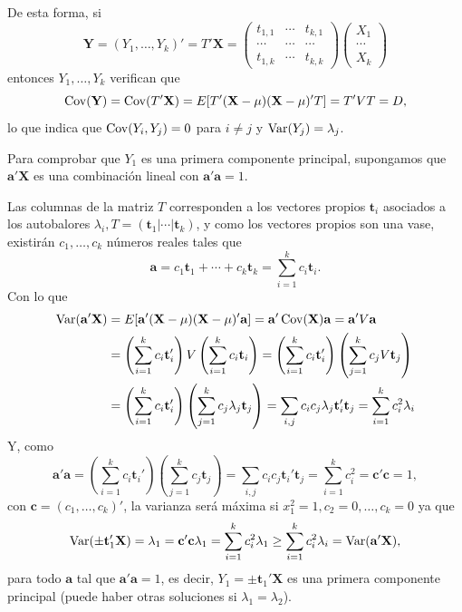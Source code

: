 De esta forma, si \[ \mathbf{Y}=(Y_1,\dots,Y_k)'=T'\mathbf{X}=\begin{pmatrix}
	t_{1,1} & \cdots & t_{k,1} \\
	\cdots & \cdots & \cdots \\
	t_{1,k} & \cdots & t_{k,k}
\end{pmatrix}\begin{pmatrix}
	X_1\\
	\cdots\\
	X_k
\end{pmatrix} \] entonces $Y_1,\dots,Y_k$ verifican que \[ \operatorname{Cov}(\mathbf{Y})=\operatorname{Cov}(T'\mathbf{X})=E[T'(\mathbf{X-\mu})(\mathbf{X}-\mu)'T]=T'VT=D, \]lo que indica que $\operatorname{Cov}(Y_i,Y_j)=0$ para $i\neq j$ y $\operatorname{Var}(Y_j)=\lambda_j$.

Para comprobar que $Y_1$ es una primera componente principal, supongamos que $\mathbf{a'X}$ es una combinación lineal con $\mathbf{a'a}=1$.

Las columnas de la matriz $T$ corresponden a los vectores propios $\mathbf{t}_i$ asociados a los autobalores $\lambda_i,T=(\mathbf{t}_1|\cdots|\mathbf{t}_k)$, y como los vectores propios son una vase, existirán $c_1,\dots,c_k$ números reales tales que \[ \mathbf{a}=c_1\mathbf{t}_1+\cdots+c_k\mathbf{t}_k=\sum_{i=1}^{k}c_i\mathbf{t}_i. \]
Con lo que 
\begin{align*}
	\operatorname{Var}(\mathbf{a'X})&=E[\mathbf{a'(X-\mu)(X-\mu)'a}]=\mathbf{a}'\operatorname{Cov}(\mathbf{X})\mathbf{a}=\mathbf{a'}V\mathbf{a}\\
	&=\left(\sum_{i=1}^{k}c_i\mathbf{t}_i'\right)V\left(\sum_{i=1}^{k}c_i\mathbf{t}_i\right)=\left(\sum_{i=1}^{k}c_i\mathbf{t}_i'\right)\left(\sum_{j=1}^{k}c_jV\mathbf{t}_j\right)\\
	&=\left(\sum_{i=1}^{k}c_i\mathbf{t}_i'\right)\left(\sum_{j=1}^{k}c_j\lambda_j\mathbf{t}_j\right)=\sum_{i,j}c_ic_j\lambda_j\mathbf{t}_i'\mathbf{t}_j=\sum_{i=1}^{k}c_i^2\lambda_i
\end{align*}
Y, como \[ \mathbf{a'a}=\left(\sum_{i=1}^{k}c_i\mathbf{t}_i'\right)\left(\sum_{j=1}^{k}c_j\mathbf{t}_j\right)=\sum_{i,j}c_ic_j\mathbf{t}_i'\mathbf{t}_j=\sum_{i=1}^{k}c_i^2=\mathbf{c'c}=1, \] con $\mathbf{c}=(c_1,\dots,c_k)'$, la varianza será máxima si $x_1^2=1,c_2=0,\dots,c_k=0$ ya que \[ \operatorname{Var}(\pm\mathbf{t}_1'\mathbf{X})=\lambda_1=\mathbf{c'c}\lambda_1=\sum_{i=1}^{k}c_i^2\lambda_1\ge\sum_{i=1}^{k}c_i^2\lambda_i=\operatorname{Var}(\mathbf{a'X}), \]para todo $\mathbf{a}$ tal que $\mathbf{a'a}=1$, es decir, $Y_1=\pm \mathbf{t}_1'\mathbf{X}$ es una primera componente principal (puede haber otras soluciones si $\lambda_1=\lambda_2$).

